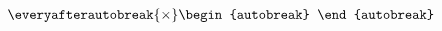 \documentclass{article}
\begin{document}
\begin{align}
  \everyafterautobreak{\times}
  \begin{autobreak}
    
  \end{autobreak}
\end{align}
\end{document}
